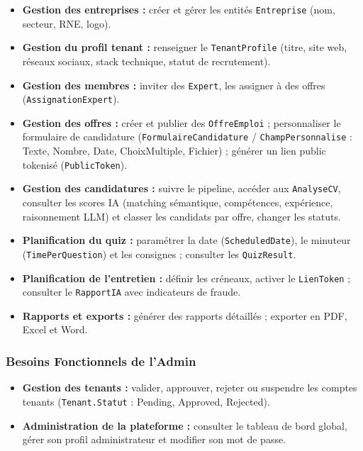 \begin{itemize}
    \item \textbf{Gestion des entreprises :} créer et gérer les entités
    \texttt{Entreprise} (nom, secteur, RNE, logo).

    \item \textbf{Gestion du profil tenant :} renseigner le \texttt{TenantProfile}
    (titre, site web, réseaux sociaux, stack technique, statut de recrutement).

    \item \textbf{Gestion des membres :} inviter des \texttt{Expert}, les assigner
    à des offres (\texttt{AssignationExpert}).

    \item \textbf{Gestion des offres :} créer et publier des \texttt{OffreEmploi} ;
    personnaliser le formulaire de candidature (\texttt{FormulaireCandidature} /
    \texttt{ChampPersonnalise} : Texte, Nombre, Date, ChoixMultiple, Fichier) ;
    générer un lien public tokenisé (\texttt{PublicToken}).

    \item \textbf{Gestion des candidatures :} suivre le pipeline, accéder aux
    \texttt{AnalyseCV}, consulter les scores IA (matching sémantique, compétences,
    expérience, raisonnement LLM) et classer les candidats par offre, changer les statuts.

    \item \textbf{Planification du quiz :} paramétrer la date (\texttt{ScheduledDate}),
    le minuteur (\texttt{TimePerQuestion}) et les consignes ; consulter les
    \texttt{QuizResult}.

    \item \textbf{Planification de l'entretien :} définir les créneaux, activer le
    \texttt{LienToken} ; consulter le \texttt{RapportIA} avec indicateurs de fraude.

    \item \textbf{Rapports et exports :} générer des rapports détaillés ; exporter
    en PDF, Excel et Word.
\end{itemize}

\subsubsection{Besoins Fonctionnels de l'Admin}

\begin{itemize}
    \item \textbf{Gestion des tenants :} valider, approuver, rejeter ou suspendre les comptes
    tenants (\texttt{Tenant.Statut} : Pending, Approved, Rejected).
    \item \textbf{Administration de la plateforme :} consulter le tableau de bord global,
    gérer son profil administrateur et modifier son mot de passe.
\end{itemize}

